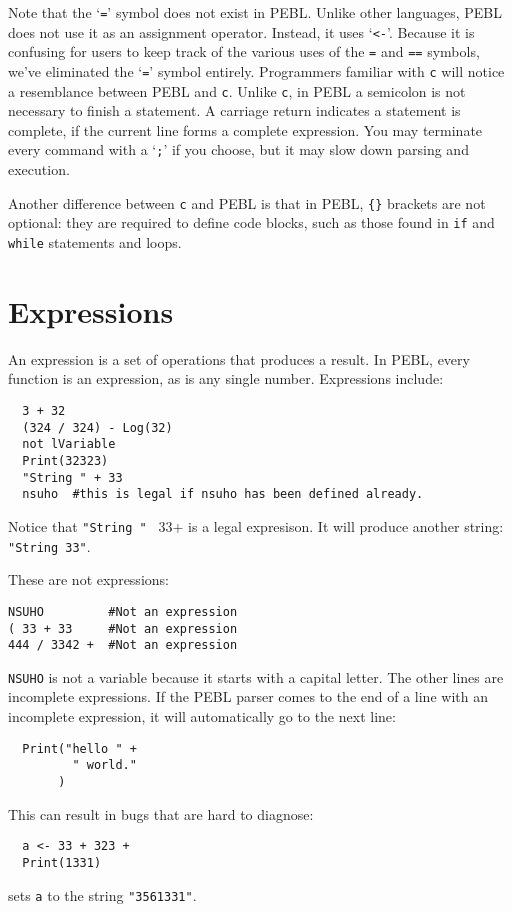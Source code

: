 Note that the `\verb+=+' symbol does not exist in PEBL. Unlike other languages, PEBL does not use it as an assignment operator. Instead, it uses `\verb+<-+'. Because it is confusing for users to keep track of the various uses of the \verb+=+ and \verb+==+ symbols, we've eliminated the `\verb+=+' symbol entirely. Programmers familiar with \texttt{c} will notice a resemblance between PEBL and \texttt{c}. Unlike \texttt{c}, in PEBL a semicolon is not necessary to finish a statement. A carriage return indicates a statement is complete, if the current line forms a complete expression. You may terminate every command with a `\texttt{;}' if you choose, but it may slow down parsing and execution.

Another difference between \texttt{c} and PEBL is that in PEBL, \verb+{}+ brackets are
not optional: they are required to define code blocks, such as those
found in \texttt{if} and \texttt{while} statements and loops.

\section{Expressions}

An expression is a set of operations that produces a
result.  In PEBL, every function is an expression, as is any
single number. Expressions include:
\begin{verbatim}
  3 + 32
  (324 / 324) - Log(32)
  not lVariable
  Print(32323)
  "String " + 33
  nsuho  #this is legal if nsuho has been defined already.
\end{verbatim}

Notice that \verb+"String " + 33+ is a legal expresison. It will
produce another string: \verb+"String 33"+.

These are not expressions:
\begin{verbatim}
NSUHO         #Not an expression
( 33 + 33     #Not an expression
444 / 3342 +  #Not an expression
\end{verbatim}
\texttt{NSUHO} is not a variable because it starts with a capital
letter. The other lines are incomplete expressions.  If the PEBL parser comes
to the end of a line with an incomplete expression, it
will automatically go to the next line:
\begin{verbatim}
  Print("hello " +
         " world."
       )
\end{verbatim}
This can result in bugs that are hard to diagnose:
\begin{verbatim}
  a <- 33 + 323 +
  Print(1331)
\end{verbatim}
sets \texttt{a} to the string \texttt{"3561331"}.

